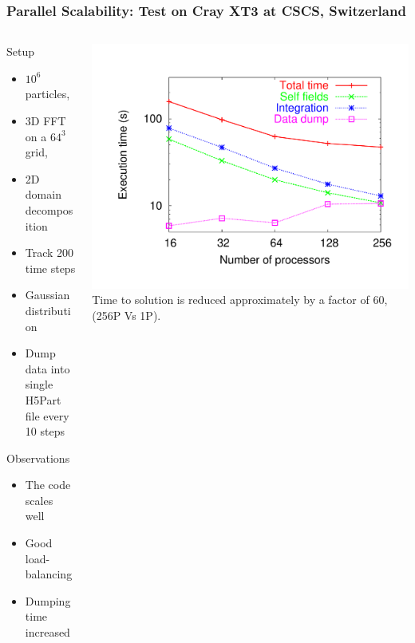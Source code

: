 \documentclass[xcolor=pdftex,table,10pt,yellow,mathserif]{beamer}
\begin{document}
\begin{frame} 
  \frametitle{Parallel Scalability: \small{Test on Cray XT3 at CSCS, Switzerland}}
  \begin{columns}
    \begin{column}{4.cm}
      \scriptsize
      \begin{block}{Setup}
        \begin{itemize}
        \item  \alert{$10^6$} particles, 
        \item 3D FFT on a  \alert{$64^3$} grid,
	\item \alert{2D} domain decomposition
	\item Track  \alert{200} time steps
        \item Gaussian distribution
	\item Dump data into \alert{single} H5Part file every 10 steps
        \end{itemize}
      \end{block}
      
      \begin{block}{Observations}
        \begin{itemize}
        \item The code scales well
	\item Good load-balancing
	\item Dumping time increased 
        \end{itemize}
      \end{block}
    \end{column}
    \begin{column}{6.5cm}
    \begin{block}{}    
      \includegraphics[width=\linewidth]{figures/Timing64mesh}
      \center Time to solution is reduced approximately by a factor of \alert{60}, (256P Vs 1P).
    \end{block}  
    \end{column}
  \end{columns}
\end{frame}
\end{document}
